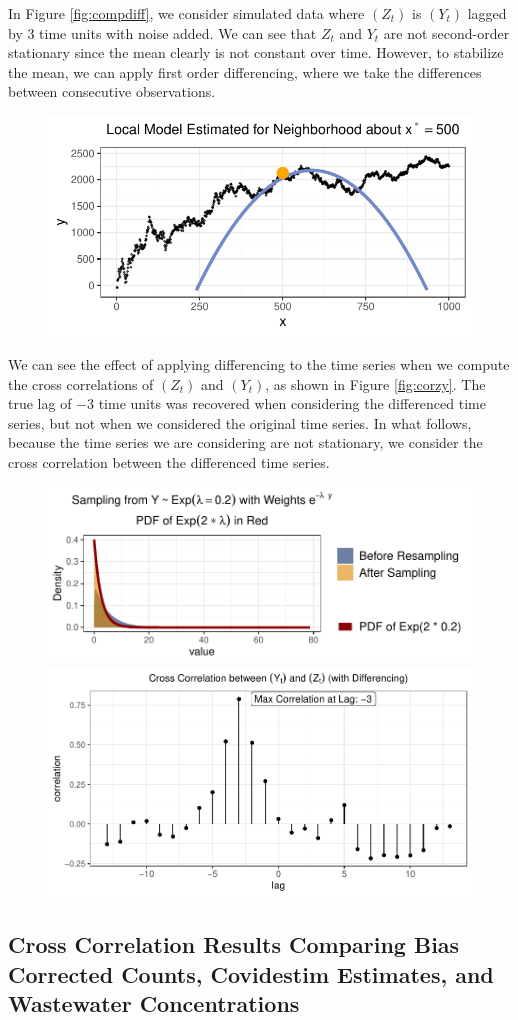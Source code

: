 \documentclass[12pt,twoside]{smiththesis}
\begin{document}
In Figure \ref{fig:compdiff}, we consider simulated data where \((Z_t)\) is \((Y_t)\) lagged by 3 time units with noise added. We can see that \(Z_t\) and \(Y_t\) are not second-order stationary since the mean clearly is not constant over time. However, to stabilize the mean, we can apply first order differencing, where we take the differences between consecutive observations.
\begin{figure}
\includegraphics[width=1\linewidth]{thesis_files/figure-latex/unnamed-chunk-21-1} \caption{\label{fig:compdiff}}\label{fig:unnamed-chunk-21}
\end{figure}
We can see the effect of applying differencing to the time series when we compute the cross correlations of \((Z_t)\) and \((Y_t)\), as shown in Figure \ref{fig:corzy}. The true lag of \(-3\) time units was recovered when considering the differenced time series, but not when we considered the original time series. In what follows, because the time series we are considering are not stationary, we consider the cross correlation between the differenced time series.
\vspace{5 cm}
\begin{figure}
\includegraphics[width=0.45\linewidth]{thesis_files/figure-latex/unnamed-chunk-22-1} \includegraphics[width=0.45\linewidth]{thesis_files/figure-latex/unnamed-chunk-22-2} \caption{\label{fig:corzy}}\label{fig:unnamed-chunk-22}
\end{figure}
\hypertarget{cross-correlation-results-comparing-bias-corrected-counts-covidestim-estimates-and-wastewater-concentrations}{%
\subsection{Cross Correlation Results Comparing Bias Corrected Counts, Covidestim Estimates, and Wastewater Concentrations}\label{cross-correlation-results-comparing-bias-corrected-counts-covidestim-estimates-and-wastewater-concentrations}}
\end{document}
